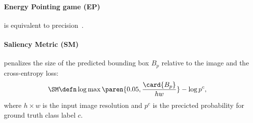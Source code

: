 \paragraph{Energy Pointing game (EP)~\citep{wang2020score}}

is equivalent to precision~.

\paragraph{Saliency Metric (SM)~\citep{dabkowski2017real}}

penalizes the size of the predicted bounding box $B_p$ relative to the image and the cross-entropy loss:
\begin{equation}
	\SM \defn \log \max\paren{ 0.05, \frac{\card{B_p}}{hw} } - \log p^c,
\label{eq:sm}
\end{equation}
where $h \times w$ is the input image resolution and $p^c$ is the precicted probability for ground truth class label $c$.

